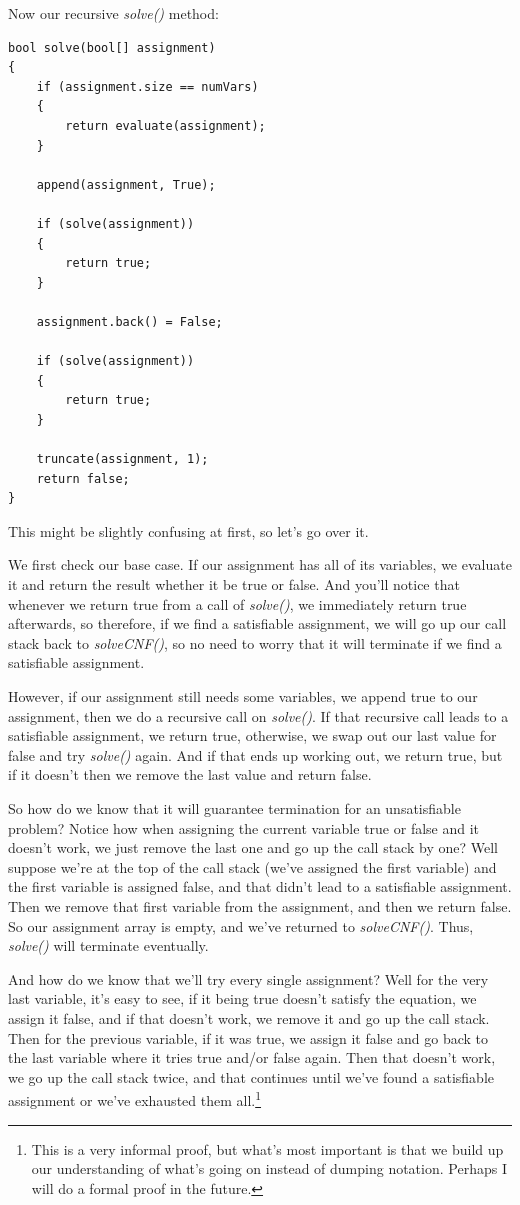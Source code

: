 \documentclass[../main.tex]{subfiles}
\begin{document}
Now our recursive \textit{solve()} method:

\begin{lstlisting}
bool solve(bool[] assignment)
{
    if (assignment.size == numVars)
    {
        return evaluate(assignment);
    }

    append(assignment, True);

    if (solve(assignment))
    {
        return true;
    }

    assignment.back() = False;

    if (solve(assignment))
    {
        return true;
    }

    truncate(assignment, 1);
    return false;
}
\end{lstlisting}

This might be slightly confusing at first, so let's go over it.

We first check our base case. If our assignment has all of its variables, we
evaluate it and return the result whether it be true or false. And you'll notice
that whenever we return true from a call of \textit{solve()}, we immediately
return true afterwards, so therefore, if we find a satisfiable assignment, we
will go up our call stack back to \textit{solveCNF()}, so no need to worry that
it will terminate if we find a satisfiable assignment.

However, if our assignment still needs some variables, we append true to our
assignment, then we do a recursive call on \textit{solve()}. If that recursive
call leads to a satisfiable assignment, we return true, otherwise, we swap out
our last value for false and try \textit{solve()} again. And if that ends up
working out, we return true, but if it doesn't then we remove the last value
and return false.

So how do we know that it will guarantee termination for an unsatisfiable problem?
Notice how when assigning the current variable true or false and it doesn't
work, we just remove the last one and go up the call stack by one? Well
suppose we're at the top of the call stack (we've assigned the first variable)
and the first variable is assigned false, and that didn't lead to a satisfiable
assignment. Then we remove that first variable from the assignment, and then
we return false. So our assignment array is empty, and we've returned to
\textit{solveCNF()}. Thus, \textit{solve()} will terminate eventually.

And how do we know that we'll try every single assignment?
Well for the very last variable, it's easy to see, if it being true doesn't satisfy
the equation, we assign it false, and if that doesn't work, we remove it and go
up the call stack. Then for the previous variable, if it was true, we assign it
false and go back to the last variable where it tries true and/or false again.
Then that doesn't work, we go up the call stack twice, and that continues until
we've found a satisfiable assignment or we've exhausted them all.\footnote{
This is a very informal proof, but what's most important is that we build up
our understanding of what's going on instead of dumping notation. Perhaps I
will do a formal proof in the future.}
\end{document}
